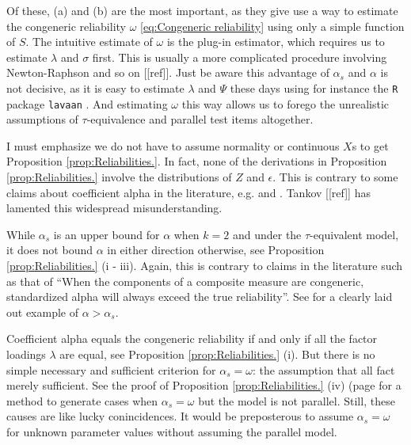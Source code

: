 \documentclass{article}
\theoremstyle{plain}
\theoremstyle{plain}
\theoremstyle{definition}
\theoremstyle{remark}
\theoremstyle{definition}
\theoremstyle{plain}
\theoremstyle{plain}
\theoremstyle{definition}
\begin{document}
Of these, (a) and (b) are the most important, as they give use a way to estimate the congeneric reliability $\omega$ \eqref{eq:Congeneric reliability} using only a simple function of $S$. The intuitive estimate of $\omega$ is the plug-in estimator, which requires us to estimate $\lambda$ and $\sigma$ first. This is usually a more complicated procedure involving Newton-Raphson and so on [[ref]]. Just be aware this advantage of $\alpha_s$ and $\alpha$ is not decisive, as it is easy to estimate $\lambda$ and $\Psi$ these days using for instance the \texttt{R} \citep{Team2013-tt} package \texttt{lavaan} \citep{Rosseel2012-yg}. And estimating $\omega$ this way allows us to forego the unrealistic assumptions of $\tau$-equivalence and parallel test items altogether.

I must emphasize we do not have to assume normality or continuous $X$s to get Proposition \ref{prop:Reliabilities.}. In fact, none of the derivations in Proposition \ref{prop:Reliabilities.} involve the distributions of $Z$ and $\epsilon$. This is contrary to some claims about coefficient alpha in the literature, e.g. \citep[][p.415]{McNeish2018-vu} and \citep[][p.21]{Zumbo2007-ap}. Tankov [[ref]] has lamented this widespread misunderstanding.

While $\alpha_s$ is an upper bound for $\alpha$ when $k = 2$ and under the $\tau$-equivalent model, it does not bound $\alpha$ in either direction otherwise, see Proposition \ref{prop:Reliabilities.} (i - iii). Again, this is contrary to claims in the literature such as that of \citep[][p.348]{Osburn2000-jd} \enquote{When the components of a composite measure are congeneric, standardized alpha will always exceed the true reliability}. See \citet[][p.450]{Falk2011-ae} for a clearly laid out example of $\alpha>\alpha_s$.

Coefficient alpha equals the congeneric reliability if and only if all the factor loadings $\lambda$ are equal, see Proposition \ref{prop:Reliabilities.} (i). But there is no simple necessary and sufficient criterion for $\alpha_s = \omega$: the assumption that all fact merely sufficient. See the proof of Proposition \ref{prop:Reliabilities.} (iv) (page \pageref{proof:Reliabilities.} for a method to generate cases when $\alpha_s = \omega$ but the model is not parallel. Still, these causes are like lucky conincidences. It would be preposterous to assume $\alpha_s = \omega$ for unknown parameter values without assuming the parallel model.
\end{document}
